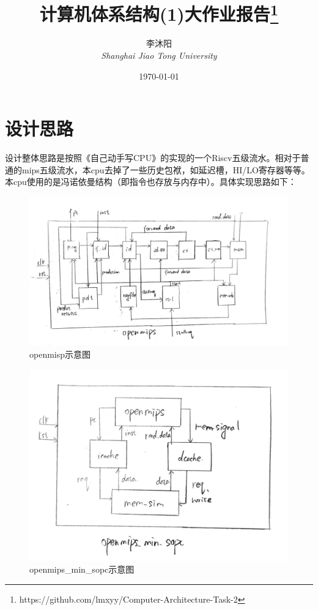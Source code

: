 \documentclass[11pt]{article}
\title{计算机体系结构(1)大作业报告\thanks{https://github.com/lmxyy/Computer-Architecture-Task-2}}
\author{李沐阳 \quad 516021910346\\ \emph{Shanghai Jiao Tong University}
}
\date{\today}
\begin{document}
\maketitle
\newpage

\section{设计思路}
\label{sec:设计思路}

设计整体思路是按照《自己动手写CPU》的实现的一个Riscv五级流水。相对于普通的mips五级流水，本cpu去掉了一些历史包袱，如延迟槽，HI/LO寄存器等等。本cpu使用的是冯诺依曼结构（即指令也存放与内存中）。具体实现思路如下：
\begin{figure}[h]
  \centering
  \includegraphics[scale=0.12]{../Picture/openmips.png}
  \caption{openmisp示意图}
  \label{fig:openmips}
\end{figure}

\begin{figure}[h]
  \centering
  \includegraphics[scale=0.12]{../Picture/openmips_min_sopc.png}  
  \caption{openmips\_min\_sopc示意图}
  \label{fig:openmips_min_sopc}
\end{figure}
\newpage{}
\end{document}
